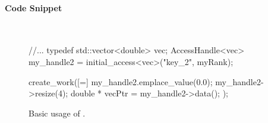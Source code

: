 \paragraph{Code Snippet}\mbox{}\\
\begin{figure}[!h]
\begin{CppCodeNumb}
//...
typedef std::vector<double> vec;
AccessHandle<vec> my_handle2 = initial_access<vec>("key_2", myRank);

create_work([=]{
  my_handle2.emplace_value(0.0);
  my_handle2->resize(4);
  double * vecPtr = my_handle2->data();    
});
\end{CppCodeNumb}
\label{fig:fe_api_arrow}
\caption{Basic usage of \protect{}.}
\end{figure}

